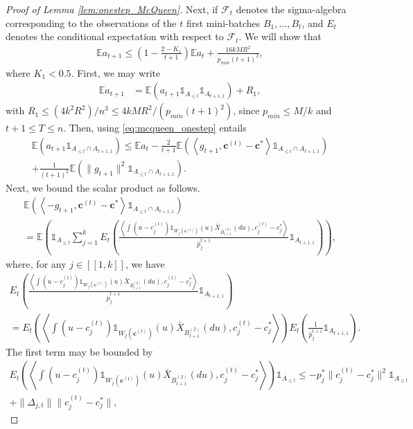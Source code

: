 \documentclass[noinfoline,preprint]{article}
\newcommand{\cb}{\mathbf{c}}
\newcommand{\E}{\mathbb{E}}
\renewcommand{\1}{\mathds 1}
\begin{document}
\begin{proof}[Proof of Lemma \ref{lem:onestep_McQueen}]
Next, if $\mathcal{F}_{t}$ denotes the sigma-algebra corresponding to the observations of the $t$ first mini-batches $B_1, \hdots, B_t$, and $E_t$ denotes the conditional expectation with respect to $\mathcal{F}_{t}$. We will show that 
\begin{align*}
\E a_{t+1} \leq \left ( 1 - \frac{2 - K_1}{t+1} \right ) \E a_t + \frac{16kMR^2}{p_{min}(t+1)^2},
\end{align*} 
where $K_1 < 0.5$. First, we may write 
\begin{align*}
\E a_{t+1} & = \E \left ( a_{t+1} \1_{A_{\leq t}} \1_{A_{t+1,1}} \right ) + R_1, 
\end{align*}
with $R_1 \leq (4k^2R^2)/n^3 \leq 4kMR^2/(p_{min} (t+1)^2)$, since $p_{min} \leq M/k$ and $t+1 \leq T \leq n$.  Then, using \eqref{eq:mcqueen_onestep} entails
\begin{multline*}
\E \left ( a_{t+1} \1_{A_{\leq t}\cap A_{t+1,1}} \right ) \leq  \E a_t - \frac{2}{t+1}\E \left ( \left\langle g_{t+1},\cb^{(t)} - \cb^* \right\rangle  \1_{A_{\leq t}\cap A_{t+1,1}} \right ) \\ 
+ \frac{1}{(t+1)^2} \E \left ( \|g_{t+1}\|^2  \1_{A_{\leq t}\cap A_{t+1,1}} \right ).
\end{multline*}
Next, we bound the scalar product as follows.
\begin{multline*}
\E \left ( \left\langle - g_{t+1},\cb^{(t)} - \cb^* \right\rangle \1_{A_{\leq t}\cap A_{t+1,1}} \right ) \\ = \E \left ( \1_{A_{\leq t}}\sum_{j=1}^k   E_t \left ( \frac{\left\langle   \int (u - c^{(t)}_j)\1_{W_j(\cb^{(t)})}(u)\bar{X}_{B^{(2)}_{t+1}}(du), c_j^{(t)} - c_j^* \right\rangle}{\hat{p}_j^{t+1}} \1_{A_{t+1,1}} \right ) \right ),
\end{multline*}
where, for any $j \in [\![1,k]\!]$, we have
\begin{multline*}
E_t \left ( \frac{\left\langle   \int (u - c^{(t)}_j)\1_{W_j(\cb^{(t)})}(u)\bar{X}_{B^{(2)}_{t+1}}(du), c_j^{(t)} - c_j^* \right\rangle}{\hat{p}_j^{t+1}} \1_{A_{t+1,1}} \right ) \\
= E_t \left (\left\langle   \int (u - c^{(t)}_j)\1_{W_j(\cb^{(t)})}(u)\bar{X}_{B^{(2)}_{t+1}}(du), c_j^{(t)} - c_j^* \right\rangle \right ) E_t \left (\frac{1}{\hat{p}_j^{t+1}} \1_{A_{t+1,1}} \right ).
\end{multline*}
The first term may be bounded by
\begin{multline*}
E_t \left (\left\langle   \int (u - c^{(t)}_j)\1_{W_j(\cb^{(t)})}(u)\bar{X}_{B^{(2)}_{t+1}}(du), c_j^{(t)} - c_j^* \right\rangle \right ) \1_{A_{\leq t}} \leq - p_j^* \| c_j^{(t)} - c_j^*\|^2 \1_{A_{\leq t}} \\ + \|\Delta_{j,t}\| \|c_j^{(t)} - c_j^*\|,

\end{multline*}
\end{proof}
\end{document}

